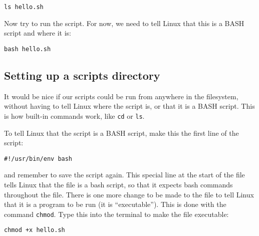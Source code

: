 \documentclass[11pt]{article}
\makeatletter
\newcommand{\boxspacing}{\kern\kvtcb@left@rule\kern\kvtcb@boxsep}
\newcommand{\prompt}[4]{
        {\ttfamily\llap{{\color{blue}\LARGE\faKeyboardO\hspace{3pt}#4}}\vspace{-\baselineskip}}
    }
\makeatother
\begin{document}
    \begin{tcolorbox}[breakable, size=fbox, boxrule=1pt, pad at break*=1mm,colback=cellbackground, colframe=cellborder]
\prompt{In}{incolor}{ }{\boxspacing}
\begin{Verbatim}[commandchars=\\\{\}]
ls hello.sh
\end{Verbatim}
\end{tcolorbox}

    Now try to run the script. For now, we need to tell Linux that this is a
BASH script and where it is:

    \begin{tcolorbox}[breakable, size=fbox, boxrule=1pt, pad at break*=1mm,colback=cellbackground, colframe=cellborder]
\prompt{In}{incolor}{ }{\boxspacing}
\begin{Verbatim}[commandchars=\\\{\}]
bash hello.sh
\end{Verbatim}
\end{tcolorbox}

    \hypertarget{setting-up-a-scripts-directory}{%
\subsection{Setting up a scripts
directory}\label{setting-up-a-scripts-directory}}

It would be nice if our scripts could be run from anywhere in the
filesystem, without having to tell Linux where the script is, or that it
is a BASH script. This is how built-in commands work, like \texttt{cd}
or \texttt{ls}.

To tell Linux that the script is a BASH script, make this the first line
of the script:

\begin{verbatim}
#!/usr/bin/env bash
\end{verbatim}

and remember to save the script again. This special line at the start of
the file tells Linux that the file is a bash script, so that it expects
bash commands throughout the file. There is one more change to be made
to the file to tell Linux that it is a program to be run (it is
``executable''). This is done with the command \texttt{chmod}. Type this
into the terminal to make the file executable:

    \begin{tcolorbox}[breakable, size=fbox, boxrule=1pt, pad at break*=1mm,colback=cellbackground, colframe=cellborder]
\prompt{In}{incolor}{ }{\boxspacing}
\begin{Verbatim}[commandchars=\\\{\}]
chmod +x hello.sh
\end{Verbatim}
\end{tcolorbox}
\end{document}
